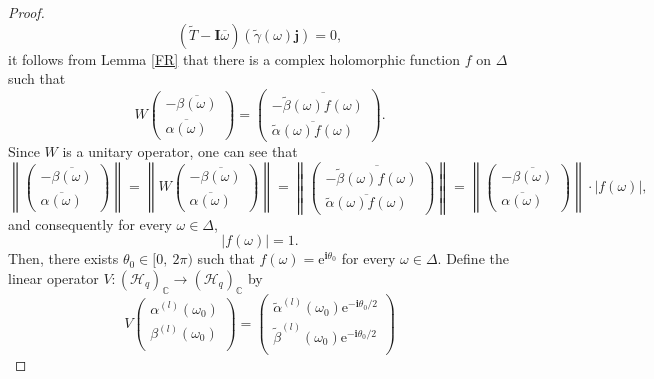 \documentclass[10pt,a4paper]{amsart}
\begin{document}
\begin{proof}
\[
(\widetilde{T}-\boldsymbol{I}\overline{\omega})(\widetilde{\gamma}(\omega)\boldsymbol{j})=0,
\]
it follows from Lemma \ref{FR} that there is a complex holomorphic function $f$ on $\Delta$ such that
    $$
    W\begin{pmatrix}
    	-\overline{\beta(\omega)} \\
    	\overline{\alpha(\omega)}
    \end{pmatrix}
    =\begin{pmatrix}
    	-\overline{\widetilde{\beta}(\omega)f(\omega)} \\
    	\overline{\widetilde{\alpha}(\omega)f(\omega)}
    \end{pmatrix}.
$$
    Since $W$ is a unitary operator, one can see that
    \[
     \left\|\begin{pmatrix}
     	-\overline{\beta(\omega)} \\
     	\overline{\alpha(\omega)}
     \end{pmatrix} \right\|=\left\|W\begin{pmatrix}
     -\overline{\beta(\omega)} \\
     \overline{\alpha(\omega)}
 \end{pmatrix} \right\|=\left\|\begin{pmatrix}
 -\overline{\widetilde{\beta}(\omega)f(\omega)} \\
 \overline{\widetilde{\alpha}(\omega)f(\omega)}
\end{pmatrix} \right\|=\left\|\begin{pmatrix}
-\overline{\beta(\omega)} \\
\overline{\alpha(\omega)}
\end{pmatrix} \right\|\cdot|f(\omega)|,
    \]
  and consequently for every $\omega\in\Delta$,
    \[
    |f(\omega)|=1.
    \]
   Then, there exists $\theta_0\in[0,\ 2\pi)$ such that
    $f(\omega)=\mathrm{e}^{\boldsymbol{i}\theta_0}$ for every $\omega\in\Delta$. Define the linear operator $V:(\mathcal{H}_q)_{\mathbb{C}}\rightarrow(\mathcal{H}_q)_{\mathbb{C}}$ by
    $$
    V
    \begin{pmatrix}
    \alpha^{(l)}(\omega_0) \\
    \beta^{(l)}(\omega_0) \\
    \end{pmatrix}
    =\begin{pmatrix}
    \widetilde{\alpha}^{(l)}(\omega_0)\mathrm{e}^{-\boldsymbol{i}\theta_0/2} \\
    \widetilde{\beta}^{(l)}(\omega_0)\mathrm{e}^{-\boldsymbol{i}\theta_0/2} \\

\end{pmatrix}$$
\end{proof}
\end{document}
